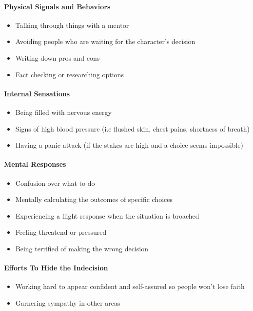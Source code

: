 \paragraph{Physical Signals and Behaviors}

\begin{itemize}
    \item Talking through things with a mentor
    \item Avoiding people who are waiting for the character's decision
    \item Writing down pros and cons
    \item Fact checking or researching options
\end{itemize}

\paragraph{Internal Sensations}

\begin{itemize}
    \item Being filled with nervous energy
    \item Signs of high blood pressure (i.e flushed skin, chest pains, shortness of breath)
    \item Having a panic attack (if the stakes are high and a choice seems impossible)
\end{itemize}

\paragraph{Mental Responses}

\begin{itemize}
    \item Confusion over what to do
    \item Mentally calculating the outcomes of specific choices
    \item Experiencing a flight response when the situation is broached
    \item Feeling threatend or pressured
    \item Being terrified of making the wrong decision
\end{itemize}

\paragraph{Efforts To Hide the Indecision}

\begin{itemize}
    \item Working hard to appear confident and self-assured so people won't lose faith
    \item Garnering sympathy in other areas
\end{itemize}


